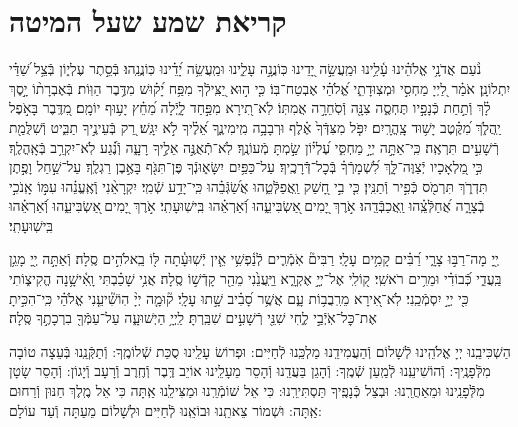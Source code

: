 \documentclass[twoside, openany, parskip=half, 11pt]{book}
\begin{document}
\chapter[קריאת שמע שעל המיטה]{ קריאת שמע שעל המיטה }

\shema

\veahavta

נֹ֨עַם אֲדֹנָ֥י אֱלֹהֵ֗ינוּ עָ֫לֵ֥ינוּ וּמַֽעֲשֵׂ֣ה יָ֭דֵינוּ כּֽוֹנֲנָ֣ה עָלֵ֑ינוּ וּמַֽעֲשֵׂ֥ה יָ֝דֵ֗ינוּ כּֽוֹנֲנֵֽהוּ׃
בְּֿסֵ֣תֶר עֶלְי֑וֹן בְּֿצֵ֥ל שַׁ֝דַּ֗י יִתְלוֹנָֽן׃
אֹמַ֗ר לַ֭יְיָ מַחְסִ֣י וּמְצֽוּדָתִ֑י אֱ֝לֹהַ֗י אֶבְטַח־בּֽוֹ׃
כִּ֤י ה֣וּא יַ֭צִּֽילְֿךָ מִפַּ֥ח יָ֝ק֗וּשׁ מִדֶּ֥בֶר הַוּֽוֹת׃
בְּֿאֶבְרָת֨וֹ יָ֣סֶךְ לָ֗ךְ וְֿתַ֣חַת כְּֿנָפָ֣יו תֶּחְסֶ֑ה צִנָּ֖ה וְֿסֹֽחֵרָ֣ה אֲמִתּֽוֹ׃
לֹֽא־תִ֭ירָא מִפַּ֣חַד לָ֑יְֿלָה מֵ֝חֵ֗ץ יָע֥וּף יוֹמָֽם׃
מִ֭דֶּֽבֶר בָּאֹ֣פֶל יַֽהֲלֹ֑ךְ מִ֝קֶּ֗טֶב יָשׁ֥וּד צָֽהֳרָֽיִם׃
יִפֹּ֤ל מִצִּדְּֿךָ֙ אֶ֗לֶף וּרְבָבָ֥ה מִֽימִינֶ֑ךָ אֵ֝לֶ֗יךָ לֹ֣א יִגָּֽשׁ׃
רַ֭ק בְּֿעֵינֶ֣יךָ תַבִּ֑יט וְֿשִׁלֻּמַ֖ת רְֿשָׁעִ֣ים תִּרְאֶֽה׃
כִּֽי־אַתָּ֣ה יְיָ֣ מַחְסִּ֑י עֶ֝לְי֗וֹן שַׂ֣מְתָּ מְֿעוֹנֶֽךָ׃
לֹֽא־תְֿֿאֻנֶּ֣ה אֵלֶ֣יךָ רָעָ֑ה וְֿנֶ֗֝גַע לֹֽא־יִקְרַ֥ב בְּֿאָֽהֳלֶֽךָ׃
כִּ֣י מַ֭לְאָכָיו יְֿצַוֶּה־לָּ֑ךְ לִ֝שְׁמָרְֿךָ֗ בְּֿכׇל־דְּֿֿרָכֶֽיךָ׃
עַל־כַּפַּ֥יִם יִשָּׂא֑וּנְֿךָ פֶּן־תִּגֹּ֖ף בָּאֶ֣בֶן רַגְלֶֽךָ׃
עַל־שַׁ֣חַל וָפֶ֣תֶן תִּדְרֹ֑ךְ תִּרְמֹ֖ס כְּֿפִ֣יר וְֿתַנִּֽין׃
כִּ֤י בִ֣י חָ֭שַׁק וַֽאֲפַלְּֿטֵ֑הוּ אֲשַׂ֝גְּֿבֵ֗הוּ כִּֽי־יָדַ֥ע שְֿׁמִֽי׃
יִקְרָאֵ֨נִי וְֽֿאֶֽעֱנֵ֗הוּ עִמּ֣וֹ אָֽנֹכִ֣י בְֿצָרָ֑ה אֲ֝חַלְּֿצֵֽ֗הוּ וַֽאֲכַבְּֿדֵֽהוּ׃
אֹ֣רֶךְ יָ֭מִים ֖אַשְׂבִּיעֵ֑הוּ וְֿ֝אַרְאֵ֗הוּ בִּֽישֽׁוּעָתִֽי׃
אֹ֣רֶךְ יָ֭מִים ֖אַשְׂבִּיעֵ֑הוּ וְֿ֝אַרְאֵ֗הוּ בִּֽישֽׁוּעָתִֽי׃

יְ֖יָ מָה־רַבּ֣וּ צָרָ֑י רַ֝בִּ֗ים קָמִ֥ים עָלָֽי׃ רַבִּים֘ אֹֽמְֿרִ֢ים לְֿנַ֫פְשִׁ֥י אֵ֤ין יְֿשֽׁוּעָ֓תָה לּ֖וֹ בֵֽאלֹהִ֣ים סֶֽלָה׃ וְֿאַתָּ֣ה יְ֖יָ מָגֵ֥ן בַּֽעֲדִ֑י כְּֿ֝בוֹדִ֗י וּמֵרִ֥ים רֹאשִֽׁי׃ ק֭וֹלִֽי אֶל־יְיָ֣ אֶקְרָ֑א וַיַּֽעֲנֵ֙נִי מֵהַ֖ר קָדְֿשׁ֣וֹ סֶֽלָה׃ אֲנִ֥י שָׁכַ֗בְתִּי וָֽאִ֫ישָׁ֥נָה הֱקִיצ֑וֹתִי כִּ֖י יְיָ֣ יִסְמְֿכֵֽנִי׃ לֹֽא־אִ֭ירָא מֵרִֽבֲב֥וֹת עָ֑ם אֲשֶׁ֥ר סָ֝בִ֗יב שָׁ֣תוּ עָלָֽי׃ ק֘וּמָ֤ה יְיָ֨ הֽוֹשִׁ֘יעֵ֤נִי אֱלֹהַ֗י כִּֽי־הִכִּ֣יתָ אֶת־כׇּל־אֹֽיְֿבַ֣י לֶ֑חִי שִׁנֵּ֖י רְֿשָׁעִ֣ים שִׁבַּֽרְתָּ׃ לַֽיְיָ֥ הַיְשׁוּעָ֑ה עַל־עַמְּֿךָ֖ בִרְכָתֶ֣ךָ סֶּֽלָה׃

הַשְׁכִּיבֵֽנוּ יְיָ אֱלֹהֵֽינוּ לְֿשָׁלוֹם וְֿהַעֲמִידֵֽנוּ מַלְכֵּֽנוּ לְֿחַיִּים: וּפְרוֹשׂ עָלֵֽינוּ סֻכַּת שְֿׁלוֹמֶֽךָ: וְֿתַקְּֿנֵֽנוּ בְּֿעֵצָה טוֹבָה מִלְּֿפָנֶֽיךָ: וְֿהוֹשִׁיעֵֽנוּ לְֿמַֽעַן שְֿׁמֶֽךָ: וְֿהָגֵן בַּעֲדֵֽנוּ וְֿהָסֵר מֵעָלֵֽינוּ אוֹיֵב דֶּֽבֶר וְֿחֶֽרֶב וְֿרָעָב וְֿיָגוֹן: וְֿהָסֵר שָׂטָן מִלְּֿֿפָנֵֽינוּ וּמֵאַחֲרֵֽנוּ: וּבְצֵל כְּֿנָפֶֽיךָ תַּסְתִּירֵֽנוּ: כִּי אֵל שׁוֹמְֿרֵֽנוּ וּמַצִּילֵֽנוּ אַֽתָּה כִּי אֵל מֶֽלֶךְ חַנּוּן וְֿרַחוּם אַֽתָּה: וּשְׁמוֹר צֵאתֵֽנוּ וּבוֹאֵֽנוּ לְֿחַיִּים וּלְשָׁלוֹם מֵעַתָּה וְֿעַד עוֹלָם:
\end{document}
